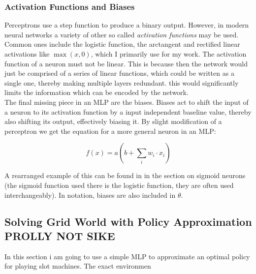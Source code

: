 \subsubsection{Activation Functions and Biases}\label{subsubsec:nn:comp:activation}
Perceptrons use a step function to produce a binary output. However, in modern neural networks a variety of other so called \textit{activation functions} may be used. Common ones include the logistic function, the arctangent and rectified linear activations like $\max(x, 0)$, which I primarily use for my work. The activation function of a neuron must not be linear. This is because then the network would just be comprised of a series of linear functions, which could be written as a single one, thereby making multiple layers redundant. this would significantly limits the information which can be encoded by the network. 
\noindent
\\ The final missing piece in an MLP are the biases. Biases act to shift the input of a neuron to its activation function by a input independent baseline value, thereby also shifting its output, effectively biasing it. By slight modification of a perceptron we get the equation for a more general neuron in an MLP:

\begin{equation}\label{neuron}
    f(x) = a(b + \sum_i w_i \cdot x_i)
\end{equation}

\noindent
A rearranged example of this can be found in \cite[chap. 1]{nielsen_neural_2015} in the section on sigmoid neurons (the sigmoid function used there is the logistic function, they are often used interchangeably). In notation, biases are also included in $\theta$.

\subsection{Solving Grid World with Policy Approximation PROLLY NOT SIKE}\label{subsec:nn:example}
In this section i am going to use a simple MLP to approximate an optimal policy for playing slot machines. The exact environmen